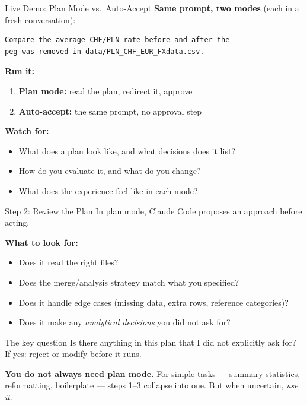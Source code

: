\documentclass[aspectratio=169, 11pt]{beamer}
\begin{document}
\begin{frame}[fragile]{Live Demo: Plan Mode vs.\ Auto-Accept}
  \textbf{Same prompt, two modes} (each in a fresh conversation):
  \begin{lstlisting}[basicstyle=\ttfamily\footnotesize]
Compare the average CHF/PLN rate before and after the
peg was removed in data/PLN_CHF_EUR_FXdata.csv.
  \end{lstlisting}

  \vspace{0.3em}
  \textbf{Run it:}
  \begin{enumerate}
    \item \textbf{Plan mode:} read the plan, redirect it, approve
    \item \textbf{Auto-accept:} the same prompt, no approval step
  \end{enumerate}

  \vspace{0.3em}
  \textbf{Watch for:}
  \begin{itemize}
    \item What does a plan look like, and what decisions does it list?
    \item How do you evaluate it, and what do you change?
    \item What does the experience feel like in each mode?
  \end{itemize}
\end{frame}

\begin{frame}{Step 2: Review the Plan}
  In plan mode, Claude Code proposes an approach before acting.

  \vspace{0.5em}
  \textbf{What to look for:}
  \begin{itemize}
    \item Does it read the right files?
    \item Does the merge/analysis strategy match what you specified?
    \item Does it handle edge cases (missing data, extra rows, reference categories)?
    \item Does it make any \textit{analytical decisions} you did not ask for?
  \end{itemize}

  \vspace{0.5em}
  \begin{alertblock}{The key question}
    Is there anything in this plan that I did not explicitly ask for?\\
    If yes: reject or modify before it runs.
  \end{alertblock}

  \vspace{0.5em}
  \textbf{You do not always need plan mode.} For simple tasks --- summary statistics, reformatting, boilerplate --- steps 1--3 collapse into one. But when uncertain, \textit{use it}.
\end{frame}
\end{document}
